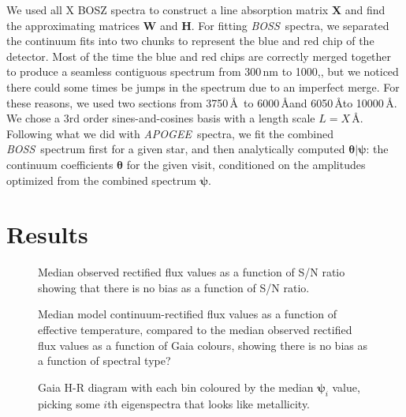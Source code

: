 \documentclass[modern]{aastex631}
\newcommand{\project}[1]{\textit{#1}}
\newcommand{\vectheta}{\boldsymbol{\theta}}
\newcommand{\vecpsi}{\boldsymbol{\psi}}
\newcommand{\vecW}{\mathbf{W}}
\newcommand{\vecH}{\mathbf{H}}
\newcommand{\vecX}{\mathbf{X}}
\newcommand{\apogee}{\project{APOGEE}}
\newcommand{\boss}{\project{BOSS}}
\newcommand{\todo}[1]{\textcolor{tab:blue}{#1}}
\begin{document}
We used all \todo{X} BOSZ spectra to construct a line absorption matrix $\vecX$ and find the approximating matrices $\vecW$ and $\vecH$. For fitting \boss\ spectra, we separated the continuum fits into two chunks to represent the blue and red chip of the detector. Most of the time the blue and red chips are correctly merged together to produce a seamless contiguous spectrum from \todo{300\,nm to 1000,\nm}, but we noticed there could some times be jumps in the spectrum due to an imperfect merge. For these reasons, we used two sections from \todo{3750\,\AA\ to 6000\,\AA and 6050\,\AA to 10000\,\AA}. We chose a \todo{3rd} order sines-and-cosines basis with a length scale $L = X$\,\AA. Following what we did with \apogee\ spectra, we fit the combined \boss\ spectrum first for a given star, and then analytically computed $\vectheta{}|\vecpsi$: the continuum coefficients $\vectheta$ for the given visit, conditioned on the amplitudes optimized from the combined spectrum $\vecpsi$.

\section{Results}\label{sec:results}

\begin{figure}
    \caption{Median observed rectified flux values as a function of S/N ratio showing that there is no bias as a function of S/N ratio.}
\end{figure}


\begin{figure}
    \caption{Median model continuum-rectified flux values as a function of effective temperature, compared to the median observed rectified flux values as a function of Gaia colours, showing there is no bias as a function of spectral type?}
\end{figure}


\begin{figure}
    \caption{Gaia H-R diagram with each bin coloured by the median $\vecpsi_i$ value, picking some $i$th eigenspectra that looks like metallicity. \label{fig:gaia_hrd_metallicity}}
\end{figure}


\begin{figure*}
    \caption{The median pixel $\chi^2$ value as a function of \emph{Gaia} $\mathrm{BP} - \mathrm{RP}$ color for main-sequence stars observed with the BOSS spectrograph. \todo{Should expect to see increasing residuals due to TiO bands not captured by the model, and emission lines.}}
\end{figure*}
\end{document}
